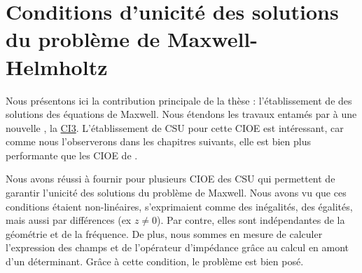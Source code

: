 \chapter[Unicité des solutions de Maxwell]{Conditions d'unicité des solutions du problème de Maxwell-Helmholtz}
\label{sec:csu}
\minitoc
\newpage
{}
Nous présentons ici la contribution principale de la thèse : l'établissement de  des solutions des équations de Maxwell.
Nous étendons les travaux entamés par \cite{stupfel_sufficient_2011} à une nouvelle , la \hyperlink{ci3}{CI3}.
L'établissement de CSU pour cette CIOE est intéressant, car comme nous l'observerons dans les chapitres suivants, elle est bien plus performante que les CIOE de \cite{stupfel_sufficient_2011}.





Nous avons réussi à fournir pour plusieurs CIOE des CSU qui permettent de garantir l'unicité des solutions du problème de Maxwell.
Nous avons vu que ces conditions étaient non-linéaires, s'exprimaient comme des inégalités, des égalités, mais aussi par différences (ex \(z\not=0\)).
Par contre, elles sont indépendantes de la géométrie et de la fréquence.
De plus, nous sommes en mesure de calculer l'expression des champs et de l'opérateur d'impédance grâce au calcul en amont d'un déterminant.
Grâce à cette condition, le problème est bien posé.